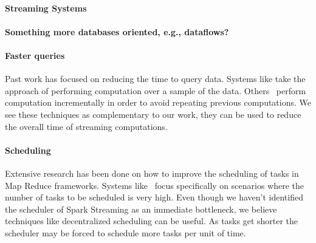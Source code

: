
\paragraph {\bf Streaming Systems} 

\paragraph {\bf Something more databases oriented, e.g., dataflows?}

\paragraph {\bf Faster queries} Past work
has focused on reducing the time to query data. Systems like \cite{BlinkDB, OnlineAggregation} take the approach of performing computation over a sample of the data.
Others~\cite{Incoop} perform computation incrementally in order to avoid repeating previous computations. 
We see these techniques as complementary to our work, they can be used to reduce the overall time of streaming computations.

\paragraph {\bf Scheduling} Extensive research has been done on how to improve the scheduling of tasks in Map Reduce frameworks. 
Systems like~\cite{Sparrow} focus specifically on scenarios where the number of tasks to be scheduled is very high.
Even though we haven't identified the scheduler of Spark Streaming as an immediate bottleneck,
we believe techniques like decentralized scheduling can be useful.
As tasks get shorter the scheduler may be forced to schedule more tasks per unit of time.
